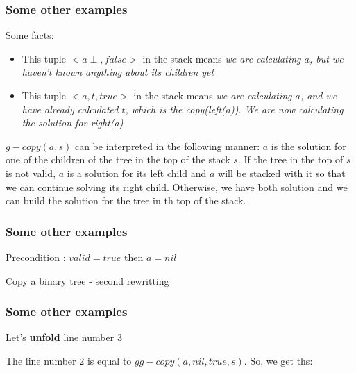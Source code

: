\documentclass{beamer}
\begin{document}
\begin{frame}
	\frametitle{Some other examples}
	Some facts:
	\begin{itemize}
		\item This tuple $<a \perp, false>$ in the stack means \textit{we are calculating $a$, but we haven't known anything about its children yet}
		\item This tuple $<a,t,true>$ in the stack means \textit{we are calculating $a$, and we have already calculated $t$, which is the copy(left(a)). We are now calculating the solution for right(a)}
	\end{itemize}
	$g-copy(a,s)$ can be interpreted in the following manner: $a$ is the solution for one of the children of the tree in the top of the stack $s$. If the tree in the top of $s$ is not valid, $a$ is a solution for its left child and $a$ will be stacked with it so that we can continue solving its right child. Otherwise, we have both solution and we can build the solution for the tree in th top of the stack.
\end{frame}
\begin{frame}
	\frametitle{Some other examples}
	Precondition : $valid = true$ then $a = nil$
	\begin{block}{Copy a binary tree - second rewritting}
		\begin{algorithmic}[1]
					\State {}
				\Else
					\State {}
				\EndIf
			\EndProcedure
		\end{algorithmic}
	\end{block}
\end{frame}
\begin{frame}
	\frametitle{Some other examples}
	Let's \textbf{unfold} line number $3$
	\begin{algorithmic}[1]
			\State{}
		\Else
			\State{}
		\EndIf
	\end{algorithmic}
	The line number $2$ is equal to $gg-copy(a,nil, true, s)$. So, we get ths:
	\begin{algorithmic}[1]
			\State{}
		\Else
			\State{}
		\EndIf
	\end{algorithmic}
	
\end{frame}
\end{document}
